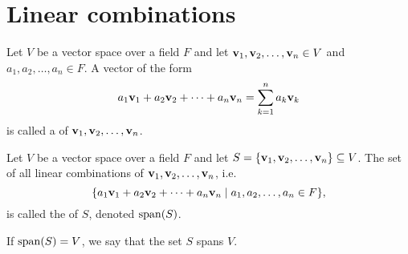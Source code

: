 \section{Linear combinations}

\begin{definition}
Let $ V $ be a vector space over a field $ F $ and let $ \mathbf{v}_1,\mathbf{v}_2,\ldots,\mathbf{v}_n\in V $ and $ a_1,a_2,\ldots,a_n\in F $. A vector of the form
\begin{equation*}
    a_1\mathbf{v}_1+a_2\mathbf{v}_2+\cdots+a_n\mathbf{v}_n=\sum_{k=1}^n a_k\mathbf{v}_k
\end{equation*}
is called a  of $ \mathbf{v}_1,\mathbf{v}_2,\ldots,\mathbf{v}_n $.
\end{definition}

\begin{definition}
Let $ V $ be a vector space over a field $ F $ and let $ S=\{\mathbf{v}_1,\mathbf{v}_2,\ldots,\mathbf{v}_n\}\subseteq V $. The set of all linear combinations of $ \mathbf{v}_1,\mathbf{v}_2,\ldots,\mathbf{v}_n $, i.e.
\begin{equation*}
    \{a_1\mathbf{v}_1+a_2\mathbf{v}_2+\cdots+a_n\mathbf{v}_n\mid a_1,a_2,\ldots,a_n\in F\},
\end{equation*}
is called the  of $ S $, denoted $ \operatorname{span}(S) $.

If $ \operatorname{span}(S)=V $, we say that the set $ S $ spans $ V $.
\end{definition}

